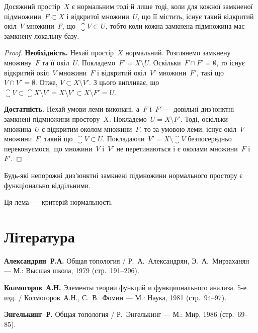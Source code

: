 \begin{theorem}
    Досяжний простір~$X$ є нормальним тоді й лише тоді, коли для кожної замкненої підмножини~$F \subset X$ і відкритої множини~$U$, що її містить, існує такий відкритий окіл~$V$ множини~$F$, що~$\closure{V} \subset U$, тобто коли кожна замкнена підмножина має замкнену локальну базу.
\end{theorem}

\begin{proof}
    \textbf{Необхідність.} Нехай простір~$X$ нормальний. Розглянемо замкнену множину~$F$ та її окіл~$U$. Покладемо~$F' = X \setminus U$. Оскільки~$F \cap F' = \emptyset$, то існує відкритий окіл~$V$ множини~$F$ і відкритий окіл~$V'$ множини~$F'$, такі що~$V \cap V' = \emptyset$. Отже, $V \subset X \setminus V'$. З цього випливає, що~$\closure{V} \subset \closure{X \setminus V'} = X \setminus V' \subset X \setminus F' = U$.

    \textbf{Достатність.} Нехай умови леми виконані, а~$F$ і~$F'$ --- довільні диз'юнктні замкнені підмножини простору~$X$. Покладемо~$U = X \setminus F'$. Тоді, оскільки множина~$U$ є відкритим околом множини~$F$, то за умовою леми, існує окіл~$V$ множини~$F$, такий що~$\closure{V} \subset U$. Покладаючи~$V' = X \setminus \closure{V}$ безпосередньо переконуємося, що множини~$V$ і~$V'$ не перетинаються і є околами множини~$F$ і~$F'$.
\end{proof}

\begin{theorem}
    Будь-які непорожні диз'юнктні замкнені підмножини нормального простору є функціонально віддільними.
\end{theorem}

\begin{remark}
    Ця лема~--- критерій нормальності.
\end{remark}

\section{Література}

\begin{enumerate}[label={[\arabic*]}]
\item \textbf{Александрян~Р.А.}
Общая топология /
Р.~А.~Александрян, Э.~А.~Мирзаханян ---
М.: Высшая школа, 1979 (стр.~191--206).
\item \textbf{Колмогоров~А.Н.}
Элементы теории функций и функционального анализа. 5-е изд. /
Колмогоров~А.Н., С.~В.~Фомин ---
М.: Наука, 1981 (стр.~94--97).
\item \textbf{Энгелькинг~Р.}
Общая топология /
Р.~Энгелькинг ---
М.: Мир, 1986 (стр.~69--85).
\end{enumerate}